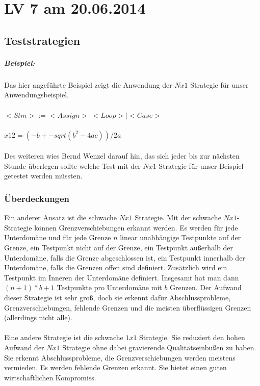 \chapter{LV 7 am 20.06.2014}
\section{Teststrategien}
\paragraph{Beispiel:}
Das hier angeführte Beispiel zeigt die Anwendung der $Nx1$ Strategie für unser Anwendungsbeispiel.\\\\
$<Stm> := <Assign> | <Loop> | <Case>$\\\\
$x12 = (-b +- sqrt(b^2 - 4ac))/2a$\\\\
Des weiteren wies Bernd Wenzel darauf hin, das sich jeder bis zur nächsten Stunde überlegen sollte welche Test mit der $Nx1$ Strategie für unser Beispiel getestet werden müssten. 

\subsection{Überdeckungen}
Ein anderer Ansatz ist die schwache $Nx1$ Strategie. Mit der schwache $Nx1$-Strategie können Grenzverschiebungen erkannt werden. Es werden für jede Unterdomäne und für jede Grenze $n$ linear unabhängige Testpunkte auf der Grenze, ein Testpunkt nicht auf der Grenze, ein Testpunkt außerhalb der Unterdomäne, falls die Grenze abgeschlossen ist, ein Testpunkt innerhalb der Unterdomäne, falls die Grenzen offen sind definiert. Zusätzlich wird ein Testpunkt im Inneren der Unterdomäne definiert. Insgesamt hat man dann $(n+1)*b+1$ Testpunkte pro Unterdomäne mit $b$ Grenzen. Der Aufwand dieser Strategie ist sehr groß, doch sie erkennt dafür Abschlussprobleme, Grenzverschiebungen, fehlende Grenzen und die meisten überflüssigen Grenzen (allerdings nicht alle). 
\\\\
Eine andere Strategie ist die schwache $1x1$ Strategie. Sie reduziert den hohen Aufwand der $Nx1$ Strategie ohne dabei gravierende Qualitätseinbußen zu haben. Sie erkennt Abschlussprobleme, die Grenzverschiebungen werden meistens vermieden. Es werden fehlende Grenzen erkannt. Sie bietet einen guten wirtschaftlichen Kompromiss.


